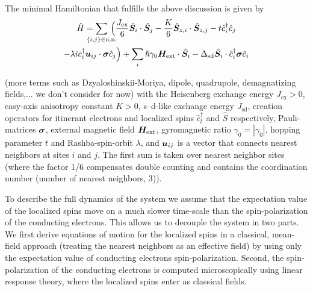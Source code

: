 The minimal Hamiltonian that fulfills the above discussion is given by 
\begin{multline}
    \hat{H}
        = \sum_{\mathclap{\{i,j\}\in\text{n.n.}}}\,\Big(\frac{J_{\text{ex}}}{6}\hat{\bb{S}}_i\cdot\hat{\bb{S}}_j - \frac{K}{6}\hat{\bb{S}}_{z,i}\cdot\hat{\bb{S}}_{z,j}-t \hat{c}_i^\dagger\hat{c}_j\\
        -\lambda i c_i^\dagger \bb{u}_{ij}\cdot\bb{\sigma}\hat{c}_j\Big)+\sum_i \hslash\gamma_0\bb{H}_\text{ext}\cdot\hat{\bb{S}}_i-\Delta_\text{sd}\hat{\bb{S}}_i\cdot\hat{c}_i^\dagger\bb{\sigma}\hat{c}_i
    \label{intro:eq:Hm}
\end{multline}

(more terms such as Dzyaloshinskii-Moriya, dipole, quadrupole, demagnatizing fields,... we don't consider for now) with the Heisenberg exchange energy $J_{\text{ex}}>0$, easy-axis anisotropy constant $K>0$, s--d-like exchange energy $J_{\text{sd}}$, creation operators for itinerant electrons and localized spins $\hat{c}^\dagger_l$ and $\hat{S}$ respectively, Pauli-matrices $\boldsymbol{\sigma}$, external magnetic field $\boldsymbol{H}_\text{ext}$, gyromagnetic ratio $\gamma_0=|\gamma_0|$, hopping parameter $t$ and Rashba-spin-orbit $\lambda$, and $\boldsymbol{u}_{ij}$ is a vector that connects nearest neighbors at sites $i$ and $j$.  The first sum is taken over nearest neighbor sites (where the factor 1/6 compensates double counting and contains the coordination number (number of nearest neighbors, 3)). 

To describe the full dynamics of the system we assume that the expectation value of the localized spins move on a much slower time-scale than the spin-polarization of the conducting electrons. This allows us to decouple the system in two parts. We first derive equations of motion for the localized spins in a classical, mean-field approach (treating the nearest neighbors as an effective field) by using only the expectation value of conducting electrons spin-polarization. Second, the spin-polarization of the conducting electrons is computed microscopically using linear response theory, where the localized spins enter as classical fields. 

